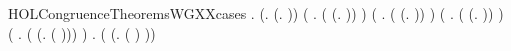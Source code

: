 \begin{SaveVerbatim}{HOLCongruenceTheoremsWGXXcases}
\HOLTokenTurnstile{} \HOLSymConst{\HOLTokenForall{}}.
         \HOLSymConst{\HOLTokenEquiv{}}
       (\HOLSymConst{\HOLTokenExists{}}.  \HOLSymConst{=} (\HOLTokenLambda{}. )) \HOLSymConst{\HOLTokenDisj{}}
       (\HOLSymConst{\HOLTokenExists{}} . ( \HOLSymConst{=} (\HOLTokenLambda{}.  )) \HOLSymConst{\HOLTokenConj{}}  ) \HOLSymConst{\HOLTokenDisj{}}
       (\HOLSymConst{\HOLTokenExists{}} . ( \HOLSymConst{=} (\HOLTokenLambda{}.   \HOLSymConst{+}  )) \HOLSymConst{\HOLTokenConj{}}   \HOLSymConst{\HOLTokenConj{}}  ) \HOLSymConst{\HOLTokenDisj{}}
       (\HOLSymConst{\HOLTokenExists{}} . ( \HOLSymConst{=} (\HOLTokenLambda{}.   \HOLSymConst{\ensuremath{\parallel}}  )) \HOLSymConst{\HOLTokenConj{}}   \HOLSymConst{\HOLTokenConj{}}  ) \HOLSymConst{\HOLTokenDisj{}}
       (\HOLSymConst{\HOLTokenExists{}} . ( \HOLSymConst{=} (\HOLTokenLambda{}. \HOLConst{\ensuremath{\nu}}  ( ))) \HOLSymConst{\HOLTokenConj{}}  ) \HOLSymConst{\HOLTokenDisj{}}
       \HOLSymConst{\HOLTokenExists{}} . ( \HOLSymConst{=} (\HOLTokenLambda{}.  ( ) )) \HOLSymConst{\HOLTokenConj{}}  
\end{SaveVerbatim}
\newcommand{\HOLCongruenceTheoremsWGXXcases}{\UseVerbatim{HOLCongruenceTheoremsWGXXcases}}
